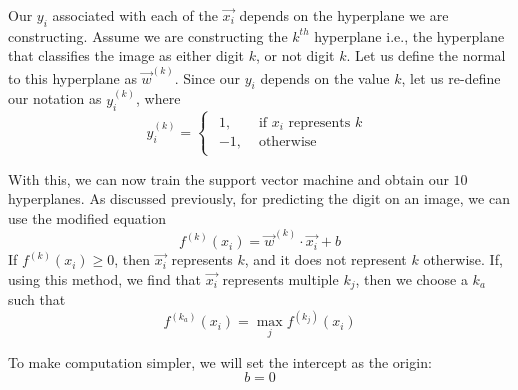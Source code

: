 Our ${y_i}$ associated with each of the $\vec{x_i}$ depends on the hyperplane we are constructing. Assume we are constructing the $k^{th}$ hyperplane i.e., the hyperplane that classifies the image as either digit $k$, or not digit $k$. Let us define the normal to this hyperplane as $\vec{w}^{(k)}$. Since our $y_i$ depends on the value $k$, let us re-define our notation as $y^{(k)}_i$, where
\begin{equation*}
    y^{(k)}_i= 
\begin{cases}
\begin{aligned}
 1,& \text{ if } x_i \text{ represents } k\\
-1,              & \text{ otherwise}
\end{aligned}
\end{cases}
\end{equation*}

With this, we can now train the support vector machine and obtain our $10$ hyperplanes. As discussed previously, for predicting the digit on an image, we can use the modified equation
\begin{equation*}
	f^{(k)}(x_i) = \vec{w}^{(k)}\cdot\vec{x_i} + b
\end{equation*}
If $f^{(k)}(x_i) \geq 0$, then $\vec{x_i}$ represents $k$, and it does not represent $k$ otherwise. If, using this method, we find that $\vec{x_i}$ represents multiple $k_j$, then we choose a $k_a$ such that
\begin{equation*}
	f^{(k_a)}(x_i) = \max_{j} f^{(k_j)}(x_i)
\end{equation*}

To make computation simpler, we will set the intercept as the origin:
\begin{equation*}
b = 0
\end{equation*}